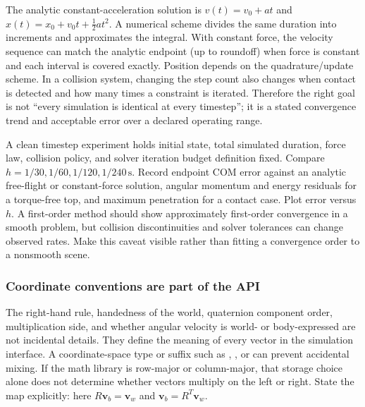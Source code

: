 \hypertarget{06-engine-ii-ch034-time-step-invariance-has-a-limited-meaning}{}

The analytic constant-acceleration solution is \(v(t)=v_0+at\) and \(x(t)=x_0+v_0t+\tfrac12at^2\). A numerical scheme divides the same duration into increments and approximates the integral. With constant force, the velocity sequence can match the analytic endpoint (up to roundoff) when force is constant and each interval is covered exactly. Position depends on the quadrature/update scheme. In a collision system, changing the step count also changes when contact is detected and how many times a constraint is iterated. Therefore the right goal is not ``every simulation is identical at every timestep''; it is a stated convergence trend and acceptable error over a declared operating range.

A clean timestep experiment holds initial state, total simulated duration, force law, collision policy, and solver iteration budget definition fixed. Compare \(h=1/30,1/60,1/120,1/240\,\mathrm s\). Record endpoint COM error against an analytic free-flight or constant-force solution, angular momentum and energy residuals for a torque-free top, and maximum penetration for a contact case. Plot error versus \(h\). A first-order method should show approximately first-order convergence in a smooth problem, but collision discontinuities and solver tolerances can change observed rates. Make this caveat visible rather than fitting a convergence order to a nonsmooth scene.

\subsubsection{Coordinate conventions are part of the API}\label{06-engine-ii-ch034-coordinate-conventions-are-part-of-the-api}

\hypertarget{06-engine-ii-ch034-coordinate-conventions-are-part-of-the-api}{}

The right-hand rule, handedness of the world, quaternion component order, multiplication side, and whether angular velocity is world- or body-expressed are not incidental details. They define the meaning of every vector in the simulation interface. A coordinate-space type or suffix such as , , or  can prevent accidental mixing. If the math library is row-major or column-major, that storage choice alone does not determine whether vectors multiply on the left or right. State the map explicitly: here \(R\mathbf v_b=\mathbf v_w\) and \(\mathbf v_b=R^T\mathbf v_w\).

